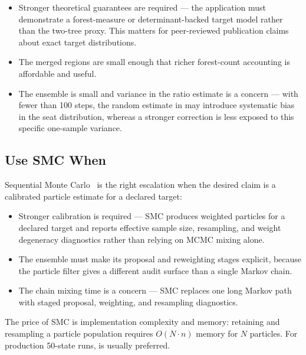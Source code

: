 \begin{itemize}
  \item Stronger theoretical guarantees are required --- the application must
        demonstrate a forest-measure or determinant-backed target model rather
        than the \mergesplit{} two-tree proxy.
        This matters for peer-reviewed publication claims about exact target
        distributions.

  \item The merged regions are small enough that richer forest-count accounting
        is affordable and useful.

  \item The ensemble is small and variance in the ratio estimate is a
        concern --- with fewer than 100 steps, the random estimate in
        \mergesplit{} may introduce systematic bias in the seat
        distribution, whereas a stronger \forestrecom{} correction is less
        exposed to this specific one-sample variance.
\end{itemize}

\subsection{Use SMC When}

Sequential Monte Carlo~\citep{dellaLibera2026smc} is the right escalation when
the desired claim is a calibrated particle estimate for a declared target:

\begin{itemize}
  \item Stronger calibration is required --- SMC produces weighted particles
        for a declared target and reports effective sample size, resampling,
        and weight degeneracy diagnostics rather than relying on MCMC mixing
        alone.

  \item The ensemble must make its proposal and reweighting stages explicit,
        because the particle filter gives a different audit surface than a
        single Markov chain.

  \item The chain mixing time is a concern --- SMC replaces one long Markov
        path with staged proposal, weighting, and resampling diagnostics.
\end{itemize}
The price of SMC is implementation complexity and memory: retaining and
resampling a particle population requires $O(N \cdot n)$ memory for $N$
particles.
For production 50-state runs, \mergesplit{} is usually preferred.

